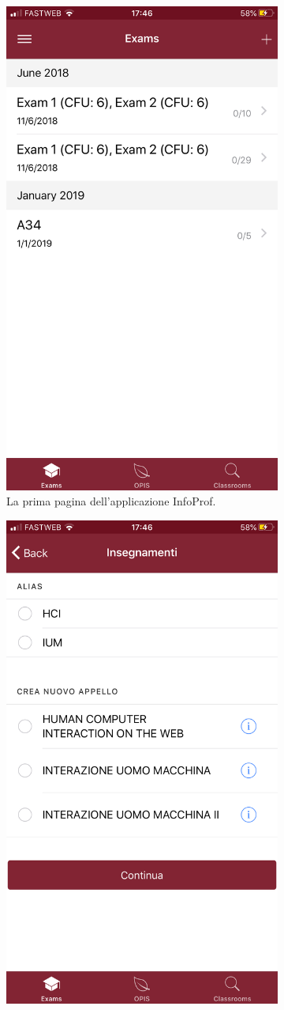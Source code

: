 \documentclass[Lau, oneside, noexaminfo]{sapthesis}%
\begin{document}
\begin{figure}[H]
	\begin{subfigure}{0.6\textwidth}
	  \centering
	  \includegraphics[width=0.5\linewidth]{ui-iterations/i/main}  
	  \caption{La prima pagina dell'applicazione InfoProf.}
	  \label{fig:sub-first}
	\end{subfigure}
	\begin{subfigure}{0.6\textwidth}
	  \centering
	  \includegraphics[width=0.5\linewidth]{ui-iterations/i/select-teaching}  

\end{subfigure}
\end{figure}
\end{document}
